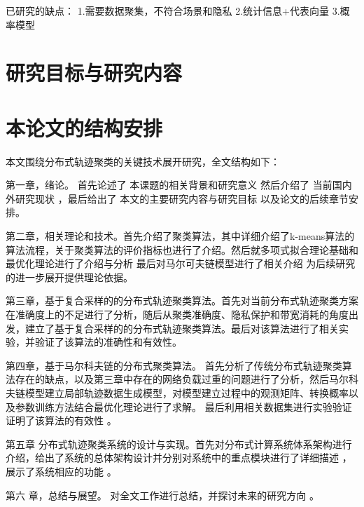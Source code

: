 已研究的缺点：
1.需要数据聚集，不符合场景和隐私
2.统计信息+代表向量
3.概率模型


\section{研究目标与研究内容}



\section{本论文的结构安排}
本文围绕分布式轨迹聚类的关键技术展开研究，全文结构如下：

第一章，绪论。 首先论述了 本课题的相关背景和研究意义 然后介绍了 当前国内外研究现状 ，最后给出了 本文的主要研究内容与研究目标 以及论文的后续章节安排。

第二章，相关理论和技术。首先介绍了聚类算法，其中详细介绍了k-means算法的算法流程，关于聚类算法的评价指标也进行了介绍。然后就多项式拟合理论基础和最优化理论进行了介绍与分析 最后对马尔可夫链模型进行了相关介绍 为后续研究的进一步展开提供理论依据。

第三章，基于复合采样的的分布式轨迹聚类算法。首先对当前分布式轨迹聚类方案在准确度上的不足进行了分析，随后从聚类准确度、隐私保护和带宽消耗的角度出发，建立了基于复合采样的的分布式轨迹聚类算法。最后对该算法进行了相关实验，并验证了该算法的准确性和有效性。

第四章，基于马尔科夫链的分布式聚类算法。 首先分析了传统分布式轨迹聚类算法存在的缺点，以及第三章中存在的网络负载过重的问题进行了分析，然后马尔科夫链模型建立局部轨迹数据生成模型，对模型建立过程中的观测矩阵、转换概率以及参数训练方法结合最优化理论进行了求解。 最后利用相关数据集进行实验验证证明了该算法的有效性 。

第五章 分布式轨迹聚类系统的设计与实现。首先对分布式计算系统体系架构进行介绍，给出了系统的总体架构设计并分别对系统中的重点模块进行了详细描述 ，展示了系统相应的功能 。

第六 章，总结与展望。 对全文工作进行总结，并探讨未来的研究方向 。
